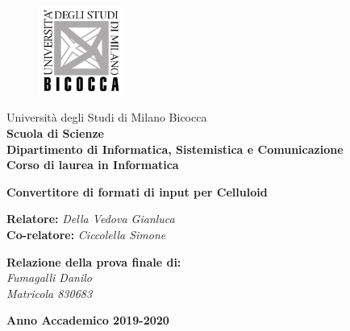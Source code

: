 \begin{titlepage}
\begin{onehalfspace}
	\begin{figure}
		\vspace*{-7mm}
		\centering
		\includegraphics[width=0.25\textwidth]{img/bicocca_logo.png}
	\end{figure}
	\par
	\noindent Università degli Studi di Milano Bicocca \\
	\textbf{Scuola di Scienze \\
			Dipartimento di Informatica, Sistemistica e Comunicazione \\
			Corso di laurea in Informatica}
\end{onehalfspace}

\vfill
\par

\begin{doublespace}
\begin{center}
	{\Huge \textbf{Convertitore di formati di input per Celluloid}}
\end{center}
\end{doublespace}

\vfill
\par

\begin{onehalfspace}
\begin{flushleft}
	{\large \textbf{Relatore:} \textit{Della Vedova Gianluca} \\
			\textbf{Co-relatore:} \textit{Ciccolella Simone}}
\end{flushleft}

\vspace{8mm}
\par

\begin{flushright}
	{\large \textbf{Relazione della prova finale di:} \\
			\textit{Fumagalli Danilo} \\
			\textit{Matricola 830683}}
\end{flushright}
\end{onehalfspace}

\vfill
\par

\begin{center}
	{\large \textbf{Anno Accademico 2019-2020}}
\end{center}

\end{titlepage}